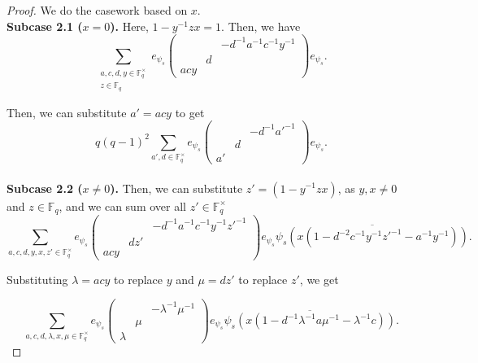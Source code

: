 \documentclass[12pt,reqno]{amsart}
\theoremstyle{definition}
\theoremstyle{remark}
\numberwithin{equation}{section}
\begin{document}
\begin{proof}
    We do the casework based on $x$.\\

    \textbf{Subcase 2.1 ($x = 0$).} Here, $1-y^{-1}zx = 1$. Then, we have
    \begin{equation*}
        \sum_{\substack{a, c, d, y \in \mathbb{F}_q^\times\\z \in \mathbb{F}_q}}e_{\psi_s}\begin{pmatrix}
            & & -d^{-1}a^{-1}c^{-1}y^{-1}\\
            & d &\\
            acy & &
        \end{pmatrix} e_{\psi_s}.
    \end{equation*}

    Then, we can substitute $a' = acy$ to get
    \begin{equation*}
        q(q-1)^2 \sum_{a', d \in \mathbb{F}_q^\times} e_{\psi_s} \begin{pmatrix}
            & & -d^{-1}a'^{-1}\\
            & d & \\
            a' & &
        \end{pmatrix} e_{\psi_s}.
    \end{equation*}\\
    
    \textbf{Subcase 2.2 ($x \ne 0$).} Then, we can substitute $z' = (1 - y^{-1}zx)$, as $y, x \ne 0$ and $z \in \mathbb{F}_q$, and we can sum over all $z' \in \mathbb{F}_q^\times$
    \begin{equation*}
        \sum_{a, c, d, y, x, z'
        \in \mathbb{F}_q^\times}e_{\psi_s}\begin{pmatrix}
            & & -d^{-1}a^{-1}c^{-1}y^{-1}z'^{-1}\\
            & dz' &\\
            acy & &
        \end{pmatrix} e_{\psi_s} \overline{\psi_s(x (1 - d^{-2}c^{-1}y^{-1}z'^{-1} - a^{-1}y^{-1}))}.
    \end{equation*}

    Substituting $\lambda = acy$ to replace $y$ and $\mu = dz'$ to replace $z'$, we get

    \begin{equation*}
        \sum_{a, c, d, \lambda, x, \mu
        \in \mathbb{F}_q^\times}e_{\psi_s}\begin{pmatrix}
            & & -\lambda^{-1}\mu^{-1}\\
            & \mu &\\
            \lambda & &
        \end{pmatrix} e_{\psi_s} \overline{\psi_s(x (1 - d^{-1}\lambda^{-1}a\mu^{-1} - \lambda^{-1}c))}.
    \end{equation*}


\end{proof}
\end{document}
